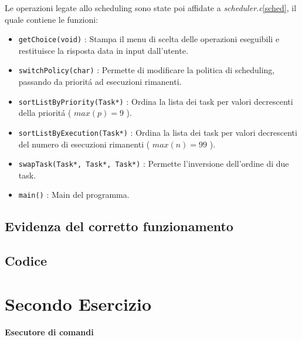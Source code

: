 \documentclass[a4paper]{article}
\begin{document}
Le operazioni legate allo scheduling sono state poi affidate a \textit{scheduler.c}\ref{sched}, il quale contiene le funzioni:

\begin{itemize}
\item \texttt{getChoice(void)} : Stampa il menu di scelta delle operazioni eseguibili e restituisce la risposta data in input dall'utente.

\item \texttt{switchPolicy(char)} : Permette di modificare la politica di scheduling, passando da priorit\'a ad esecuzioni rimanenti.

\item \texttt{sortListByPriority(Task*)} : Ordina la lista dei task per valori decrescenti della priorit\'a ( $max(p)=9$ ).

\item \texttt{sortListByExecution(Task*)} : Ordina la lista dei task per valori decrescenti del numero di esecuzioni rimanenti ( $max(n)=99$ ).

\item \texttt{swapTask(Task*, Task*, Task*)} : Permette l'inversione dell'ordine di due task.

\item \texttt{main()} : Main del programma.
\end{itemize}

\subsection{Evidenza del corretto funzionamento}



\subsection{Codice}




\newpage
\section{Secondo Esercizio}
\textbf{Esecutore di comandi}
\end{document}
